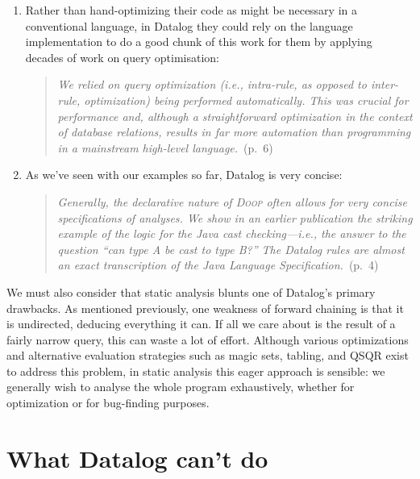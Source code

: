 \begin{enumerate}
\item Rather than hand-optimizing their code as might be necessary in a
  conventional language, in Datalog they could rely on the language
  implementation to do a good chunk of this work for them by applying decades of
  work on query optimisation:

  \begin{quote}
    \emph{We relied on query optimization (i.e., intra-rule, as opposed to
      inter-rule, optimization) being performed automatically. This was crucial
      for performance and, although a straightforward optimization in the
      context of database relations, results in far more automation than
      programming in a mainstream high-level language.}~(p.~6)
  \end{quote}
  
\item As we've seen with our examples so far, Datalog is very concise:
  
  \begin{quote}
    \emph{Generally, the declarative nature of \textsc{Doop} often allows for
      very concise specifications of analyses. We show in an earlier publication
      the striking example of the logic for the Java cast checking---i.e., the
      answer to the question ``can type A be cast to type B?'' The Datalog rules
      are almost an exact transcription of the Java Language
      Specification.}~(p.~4)
  \end{quote}
\end{enumerate}

\noindent
We must also consider that static analysis blunts one of Datalog's primary
drawbacks. As mentioned previously, one weakness of forward chaining is that it
is undirected, deducing everything it can. If all we care about is the result of
a fairly narrow query, this can waste a lot of effort. Although various
optimizations and alternative evaluation strategies such as magic sets, tabling,
and QSQR exist to address this problem, in static analysis this eager approach is
sensible: we generally wish to analyse the whole program exhaustively, whether
for optimization or for bug-finding purposes. 


\section{What Datalog can't do}

